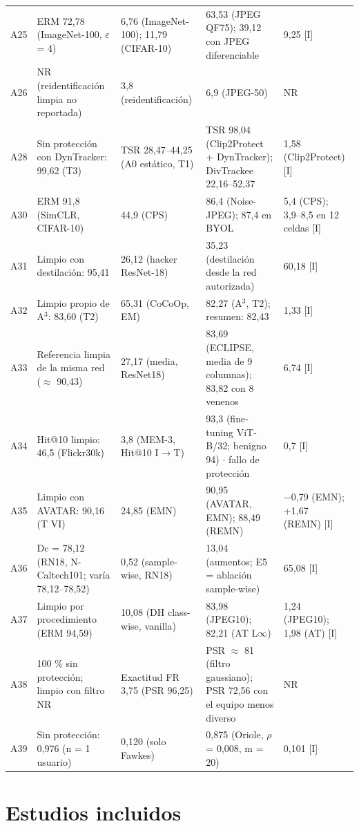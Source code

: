 \documentclass[pdflatex,sn-mathphys-num]{sn-jnl}
\theoremstyle{thmstyleone}
\theoremstyle{thmstyletwo}
\theoremstyle{thmstylethree}
\begin{document}
\begin{appendices}
\begin{longtable}{@{}L{0.95cm}L{2.7cm}L{2.2cm}L{3.5cm}L{2.2cm}@{}}
A25 & ERM\textdagger{} 72,78 (ImageNet-100, $\varepsilon$ = 4) & 6,76 (ImageNet-100); 11,79 (CIFAR-10) & 63,53 (JPEG QF75); 39,12 con JPEG diferenciable & 9,25\textdagger{} [I] \\
A26 & NR (reidentificación limpia no reportada) & 3,8 (reidentificación) & 6,9 (JPEG-50) & NR \\
A28 & Sin protección con DynTracker: 99,62 (T3) & TSR 28,47--44,25 (A0 estático, T1) & TSR 98,04 (Clip2Protect + DynTracker); DivTrackee 22,16--52,37 & 1,58 (Clip2Protect) [I] \\
A30 & ERM\textdagger{} 91,8 (SimCLR, CIFAR-10) & 44,9 (CPS) & 86,4 (Noise-JPEG); 87,4 en BYOL & 5,4\textdagger{} (CPS); 3,9--8,5\textdagger{} en 12 celdas [I] \\
A31 & Limpio con destilación: 95,41 & 26,12 (hacker ResNet-18) & 35,23 (destilación desde la red autorizada) & 60,18 [I] \\
A32 & Limpio propio de A$^{3}$: 83,60 (T2) & 65,31 (CoCoOp, EM) & 82,27 (A$^{3}$, T2); resumen: 82,43 & 1,33 [I] \\
A33 & Referencia limpia de la misma red ($\approx$ 90,43) & 27,17 (media, ResNet18) & 83,69 (ECLIPSE, media de 9 columnas); 83,82 con 8 venenos & 6,74 [I] \\
A34 & Hit@10 limpio: 46,5 (Flickr30k) & 3,8 (MEM-3, Hit@10 I$\rightarrow$T) & 93,3 (fine-tuning ViT-B/32; benigno 94) $\cdot$ fallo de protección & 0,7 [I] \\
A35 & Limpio con AVATAR: 90,16 (T VI) & 24,85 (EMN) & 90,95 (AVATAR, EMN); 88,49 (REMN) & $-$0,79 (EMN); +1,67 (REMN) [I] \\
A36 & Dc = 78,12 (RN18, N-Caltech101; varía 78,12--78,52) & 0,52 (sample-wise, RN18) & 13,04 (aumentos; E5 = ablación sample-wise) & 65,08 [I] \\
A37 & Limpio por procedimiento (ERM 94,59) & 10,08 (DH class-wise, vanilla) & 83,98 (JPEG10); 82,21 (AT L$\infty$) & 1,24 (JPEG10); 1,98 (AT) [I] \\
A38 & 100 \% sin protección; limpio con filtro NR \textdagger{} & Exactitud FR 3,75 (PSR 96,25) & PSR $\approx$ 81 (filtro gaussiano); PSR 72,56 con el equipo menos diverso & NR \\
A39 & Sin protección: 0,976 (n = 1 usuario) & 0,120 (solo Fawkes) & 0,875 (Oriole, $\rho$ = 0,008, m = 20) & 0,101 [I] \\
\end{longtable}

\section{Estudios incluidos}\label{app:corpus}


\end{appendices}
\end{document}

